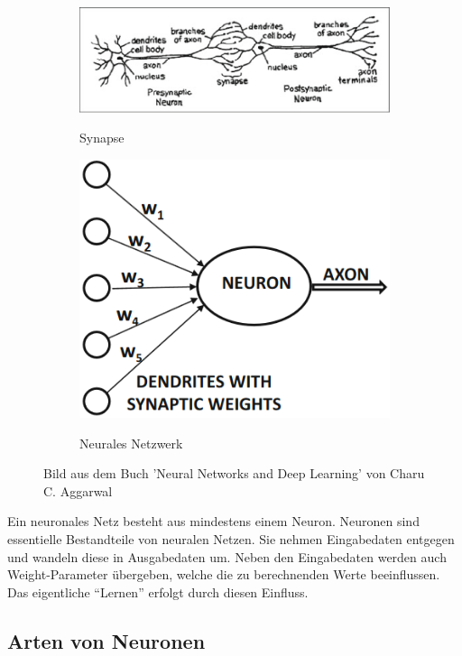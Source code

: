 \begin{figure}[H]
\begin{subfigure}{0.6\textwidth}
    \includegraphics[width=\textwidth]{Sources/01-01_synapse.png}
    \label{Synapse}
    \caption{Synapse}
\end{subfigure}
\begin{subfigure}{0.25\textwidth}
    \includegraphics[width=\textwidth]{Sources/01-02_neuron.png}
    \label{Neuron}
    \caption{Neurales Netzwerk}
\end{subfigure}
\caption{Bild aus dem Buch 'Neural Networks and Deep Learning' von Charu C. Aggarwal
}
\end{figure}
\noindent
Ein neuronales Netz besteht aus mindestens einem Neuron. Neuronen sind essentielle Bestandteile von neuralen Netzen. Sie nehmen Eingabedaten entgegen und wandeln diese 
in Ausgabedaten um. Neben den Eingabedaten werden auch Weight-Parameter übergeben, welche die zu berechnenden Werte beeinflussen. Das eigentliche \enquote{Lernen} erfolgt durch diesen 
Einfluss.
\subsection{Arten von Neuronen}\label{subsec:neuronen:arten_von_neuronen}
